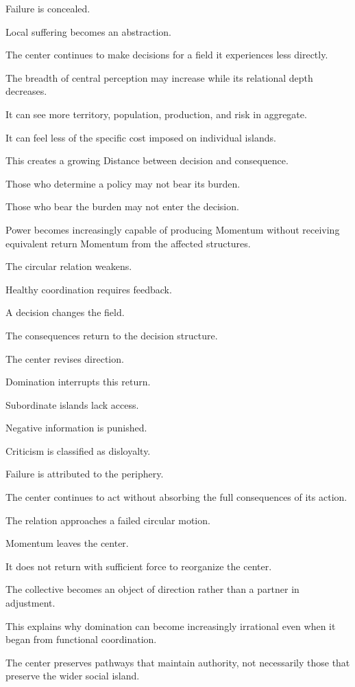 Failure is concealed.

Local suffering becomes an abstraction.

The center continues to make decisions for a field it experiences less directly.

The breadth of central perception may increase while its relational depth decreases.

It can see more territory, population, production, and risk in aggregate.

It can feel less of the specific cost imposed on individual islands.

This creates a growing Distance between decision and consequence.

Those who determine a policy may not bear its burden.

Those who bear the burden may not enter the decision.

Power becomes increasingly capable of producing Momentum without receiving equivalent return Momentum from the affected structures.

The circular relation weakens.

Healthy coordination requires feedback.

A decision changes the field.

The consequences return to the decision structure.

The center revises direction.

Domination interrupts this return.

Subordinate islands lack access.

Negative information is punished.

Criticism is classified as disloyalty.

Failure is attributed to the periphery.

The center continues to act without absorbing the full consequences of its action.

The relation approaches a failed circular motion.

Momentum leaves the center.

It does not return with sufficient force to reorganize the center.

The collective becomes an object of direction rather than a partner in adjustment.

This explains why domination can become increasingly irrational even when it began from functional coordination.

The center preserves pathways that maintain authority, not necessarily those that preserve the wider social island.

